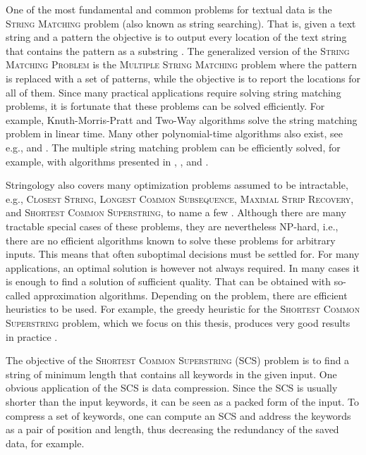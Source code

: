 \documentclass[english,twoside,censored,csm,algorithms-track-2020]{HYthesisML}
\theoremstyle{plain}
\theoremstyle{definition}
\begin{document}
One of the most fundamental and common problems for textual data is the \textsc{String Matching} problem
(also known as string searching). 
That is, given a text string and a pattern the objective is to output every location of
the text string that contains the pattern as a substring \citep{Gusfield97}.
The generalized version of the \textsc{String Matching Problem}
is the \textsc{Multiple String Matching} problem where the pattern is replaced
with a set of
patterns, while the objective is to report the locations for all of them.
Since many practical applications require solving string matching problems,
it is fortunate that these problems can be solved efficiently.
For example, Knuth-Morris-Pratt \citep{Knuth77} and Two-Way \citep{Crochemore91}
algorithms solve the string matching problem in linear time. Many other polynomial-time algorithms
also exist, see e.g., \citep{Karp87} and \citep{Horspool80}.
The multiple string matching problem can be efficiently solved, for example, with algorithms
presented in \citep{Aho75}, \citep{Navarro00}, \citep{Karp87} and \citep{CommentzWalter79}.

Stringology also covers many optimization problems assumed to be intractable, e.g., 
\textsc{Closest String},
\textsc{Longest Common Subsequence},
\textsc{Maximal Strip Recovery},
and
\textsc{Shortest Common Superstring},
to name a few \citep{Bulteau14}.
Although there are many tractable special cases of these problems, they are nevertheless
\textsc{NP}-hard, i.e., there are no efficient algorithms known to solve these
problems for arbitrary inputs.
This means that often suboptimal decisions must be settled for.
For many applications, an optimal solution is however not always required. In many cases it is
enough to find a solution of sufficient quality.
That can be obtained with so-called approximation algorithms.
Depending on the problem, there are efficient heuristics to be used. For example, the
greedy heuristic for the \textsc{Shortest Common Superstring} problem, which we focus on this
thesis, produces very good results in practice \citep{Romero04}. 

The objective of the \textsc{Shortest Common Superstring} (SCS) problem is to find a string of
minimum length that contains all keywords in the given input.
One obvious application of the SCS is data compression. Since the SCS is usually shorter
than the input keywords, it can be seen as a packed form of the input. To compress a set of keywords,
one can compute an SCS and address the keywords as a pair of position and length, thus decreasing
the redundancy of the saved data, for example.
\end{document}

